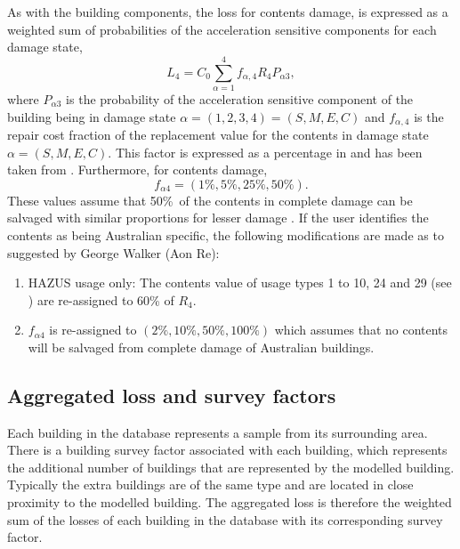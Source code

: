 As with the building components, the loss for contents damage, is
expressed as a weighted sum of probabilities of the acceleration
sensitive components for each damage state,
\begin{equation}
\label{eq:vlosses-contents}
 L_{4} = C_0 \sum_{\alpha=1}^{4} f_{\alpha,4}R_4P_{\alpha 3},
\end{equation}
where $P_{\alpha 3}$ is the probability of the acceleration
sensitive component of the building being in damage state
$\alpha=(1,2,3,4)=(S,M,E,C)$ and $f_{\alpha,4}$ is the repair cost
fraction of the replacement value for the contents in damage state
$\alpha=(S,M,E,C)$. This factor is expressed as a percentage in
 and has been taken from \citet[Table
15.6, page 15-21]{dr_FEMA99b}. Furthermore, for contents damage,
\begin{equation}
 f_{\alpha 4} = (1\%, 5\%, 25\%, 50\%).
\end{equation}
These values assume that 50\%\ of the contents in complete damage
can be salvaged with similar proportions for lesser damage
\citep{dr_FEMA99b}. If the user identifies the contents as being Australian specific, the following
modifications are made as to suggested by George Walker (Aon Re):
\begin{enumerate}
\item HAZUS usage only: The contents
value of usage types 1 to 10, 24 and 29 (see
) are re-assigned to 60\% of $R_4$.
\item $f_{\alpha 4}$ is re-assigned to $(2\%, 10\%, 50\%, 100\%)$
which assumes that no contents will be salvaged from complete
damage of Australian buildings.
\end{enumerate}

\subsection{Aggregated loss and survey factors}
\label{sec:loss-surveyfacts}

Each building in the database represents a sample from its
surrounding area. There is a building survey factor associated
with each building, which represents the additional number of
buildings that are represented by the modelled building. Typically the extra buildings
are of the same type and are located in close proximity to the
modelled building. The aggregated loss is therefore the weighted sum of the losses of
each building in the database with its corresponding survey factor.


